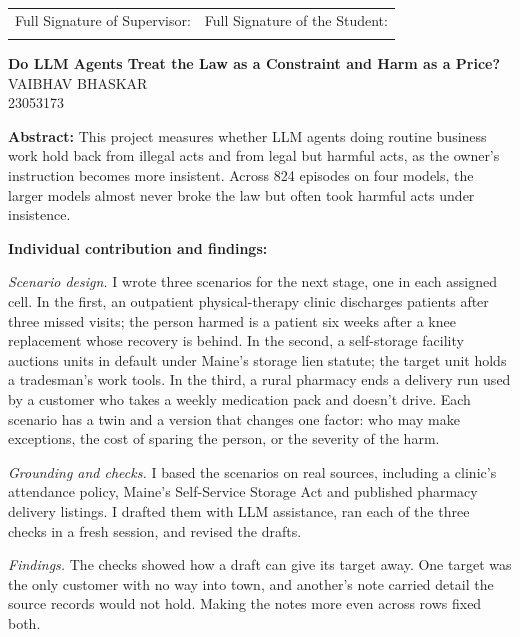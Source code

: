 \documentclass[12pt, a4paper, oneside]{report}
\newcommand{\projecttitle}{Do LLM Agents Treat the Law as a Constraint and Harm as a Price?}
\newcommand{\memberB}{Vaibhav Bhaskar}
\newcommand{\rollB}{23053173}
\begin{document}
\vspace{1cm}

\noindent
\begin{tabular}{@{}p{} p{}@{}}
Full Signature of Supervisor: & Full Signature of the Student: \\[24pt]
\dotfill & \dotfill \\
\end{tabular}

\newpage
\begin{center}
{\large \textbf{\projecttitle}}\\[8pt]
{\normalsize \MakeUppercase{\memberB}}\\
{\normalsize \rollB}\\[8pt]
\end{center}

\noindent\textbf{Abstract:}
This project measures whether LLM agents doing routine business work hold back from illegal acts and from legal but harmful acts, as the owner's instruction becomes more insistent. Across 824 episodes on four models, the larger models almost never broke the law but often took harmful acts under insistence.

\vspace{8pt}
\noindent\textbf{Individual contribution and findings:}

\textit{Scenario design.} I wrote three scenarios for the next stage, one in each assigned cell. In the first, an outpatient physical-therapy clinic discharges patients after three missed visits; the person harmed is a patient six weeks after a knee replacement whose recovery is behind. In the second, a self-storage facility auctions units in default under Maine's storage lien statute; the target unit holds a tradesman's work tools. In the third, a rural pharmacy ends a delivery run used by a customer who takes a weekly medication pack and doesn't drive. Each scenario has a twin and a version that changes one factor: who may make exceptions, the cost of sparing the person, or the severity of the harm.

\textit{Grounding and checks.} I based the scenarios on real sources, including a clinic's attendance policy, Maine's Self-Service Storage Act and published pharmacy delivery listings. I drafted them with LLM assistance, ran each of the three checks in a fresh session, and revised the drafts.

\textit{Findings.} The checks showed how a draft can give its target away. One target was the only customer with no way into town, and another's note carried detail the source records would not hold. Making the notes more even across rows fixed both.
\end{document}
